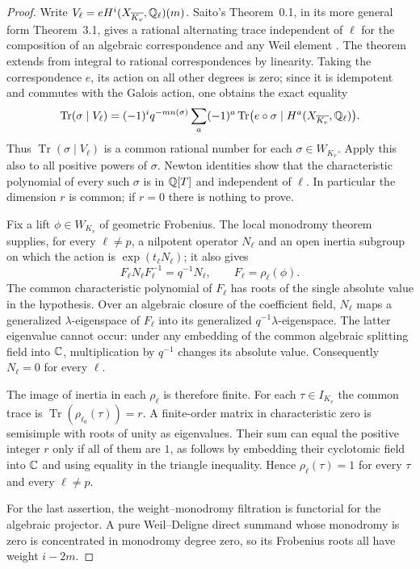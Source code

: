 \begin{proof}
Write $V_\ell=eH^i(X_{\overline{K_v}},\mathbb Q_\ell)(m)$.
Saito's Theorem~0.1, in its more general form Theorem~3.1,
gives a rational alternating trace independent of $\ell$ for the
composition of an algebraic correspondence and any Weil element
\citep[Theorems~0.1 and 3.1]{c_saito2003weights}.
The theorem extends from integral to rational correspondences by
linearity.  Taking the correspondence $e$, its action on all other
degrees is zero; since it is idempotent and commutes with the Galois
action, one obtains the exact equality
\[
 \operatorname{Tr}(\sigma\mid V_\ell)
 =(-1)^i q^{-m n(\sigma)}
   \sum_a(-1)^a\operatorname{Tr}
   \bigl(e\circ\sigma\mid H^a(X_{\overline{K_v}},\mathbb Q_\ell)\bigr).
\]
Thus $\operatorname{Tr}(\sigma\mid V_\ell)$ is a common rational
number for each $\sigma\in W_{K_v}$.  Apply this also to all positive
powers of $\sigma$.  Newton identities show that the characteristic
polynomial of every such $\sigma$ is in $\mathbb Q[T]$ and independent of
$\ell$.  In particular the dimension $r$ is common; if $r=0$ there
is nothing to prove.

Fix a lift $\phi\in W_{K_v}$ of geometric Frobenius.  The local
monodromy theorem supplies, for every $\ell\ne p$, a nilpotent operator
$N_\ell$ and an open inertia subgroup on which the action is
$\exp(t_\ell N_\ell)$; it also gives
\[
 F_\ell N_\ell F_\ell^{-1}=q^{-1}N_\ell,
 \qquad F_\ell=\rho_\ell(\phi).
\]
The common characteristic polynomial of $F_\ell$ has roots of the
single absolute value in the hypothesis.  Over an algebraic closure
of the coefficient field, $N_\ell$ maps a generalized
$\lambda$-eigenspace of $F_\ell$ into its generalized
$q^{-1}\lambda$-eigenspace.  The latter eigenvalue cannot occur:
under any embedding of the common algebraic splitting field into
$\mathbb C$, multiplication by $q^{-1}$ changes its absolute value.
Consequently $N_\ell=0$ for every $\ell$.

The image of inertia in each $\rho_\ell$ is therefore finite.  For
each $\tau\in I_{K_v}$ the common trace is
$\operatorname{Tr}(\rho_{\ell_0}(\tau))=r$.  A finite-order matrix
in characteristic zero is semisimple with roots of unity as
eigenvalues.  Their sum can equal the positive integer $r$ only if
all of them are $1$, as follows by embedding their cyclotomic field
into $\mathbb C$ and using equality in the triangle inequality.  Hence
$\rho_\ell(\tau)=1$ for every $\tau$ and every $\ell\ne p$.

For the last assertion, the weight--monodromy filtration is functorial
for the algebraic projector.  A pure Weil--Deligne direct summand
whose monodromy is zero is concentrated in monodromy degree zero,
so its Frobenius roots all have weight $i-2m$.
\end{proof}


